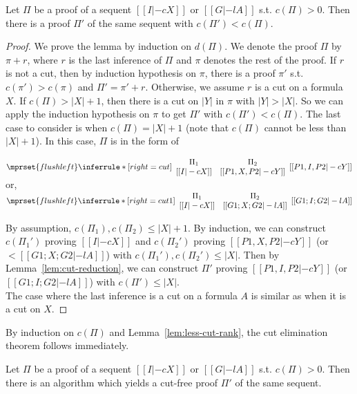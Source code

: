 \begin{lemma}
  \label{lem:less-cut-rank}
  Let $\Pi$ be a proof of a sequent $[[I |-c X]]$ or $[[G |-l A]]$ s.t.
  $c(\Pi)>0$. Then there is a proof $\Pi'$ of the same sequent with
  $c(\Pi')<c(\Pi)$.
\end{lemma}
\begin{proof}
  We prove the lemma by induction on $d(\Pi)$. We denote the proof $\Pi$ by 
  $\pi+r$, where $r$ is the last inference of $\Pi$ and $\pi$ denotes the
  rest of the proof. If $r$ is not a cut, then by induction hypothesis on
  $\pi$, there is a proof $\pi'$ s.t. $c(\pi')>c(\pi)$ and $\Pi'=\pi'+r$.
  Otherwise, we assume $r$ is a cut on a formula $X$. If $c(\Pi)>|X|+1$,
  then there is a cut on $|Y|$ in $\pi$ with $|Y|>|X|$. So we can apply
  the induction hypothesis on $\pi$ to get $\Pi'$ with $c(\Pi')<c(\Pi)$. The
  last case to consider is when $c(\Pi)=|X|+1$ (note that $c(\Pi)$ cannot be
  less than $|X|+1$). In this case, $\Pi$ is in the form of
  \begin{center}
    \scriptsize
    \begin{math}
      $$\mprset{flushleft}
      \inferrule* [right={\tiny cut}] {
        {
          \begin{array}{cc}
            \Pi_1 & \Pi_2 \\
            {[[I |-c X]]} & {[[P1, X, P2 |-c Y]]}
          \end{array}
        }
      }{[[P1, I, P2 |-c Y]]}
    \end{math}
    \qquad\qquad
    or,
    \begin{math}
      $$\mprset{flushleft}
      \inferrule* [right={\tiny cut1}] {
        {
          \begin{array}{cc}
            \Pi_1 & \Pi_2 \\
            {[[I |-c X]]} & {[[G1; X; G2 |-l A]]}
          \end{array}
        }
      }{[[G1; I; G2 |-l A]]}
    \end{math}
  \end{center}
  By assumption, $c(\Pi_1),c(\Pi_2)\leq |X|+1$. By induction, we can
  construct $c(\Pi_1')$ proving $[[I |-c X]]$ and $c(\Pi_2')$ proving
  $[[P1, X, P2 |-c Y]]$ (or $<[[G1; X; G2 |-l A]]$) with
  $c(\Pi_1'), c(\Pi_2')\leq |X|$. Then by Lemma~\ref{lem:cut-reduction}, we
  can construct $\Pi'$ proving $[[P1, I, P2 |-c Y]]$ (or
  $[[G1; I; G2 |-l A]]$) with $c(\Pi')\leq |X|$. \\
  The case where the last inference is a cut on a formula $A$ is similar as
  when it is a cut on $X$.
\end{proof}
\noindent
By induction on $c(\Pi)$ and Lemma~\ref{lem:less-cut-rank}, the cut
elimination theorem follows immediately.
\begin{theorem}
  Let $\Pi$ be a proof of a sequent $[[I |-c X]]$ or $[[G |-l A]]$ s.t.
  $c(\Pi)>0$. Then there is an algorithm which yields a cut-free proof
  $\Pi'$ of the same sequent.
\end{theorem}
